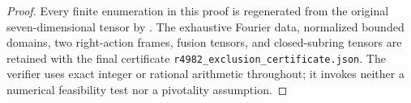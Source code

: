 \begin{proof}
Every finite enumeration in this proof is regenerated from the
original seven-dimensional tensor by
.
The exhaustive Fourier data, normalized bounded domains, two
right-action frames, fusion tensors, and closed-subring tensors
are retained with the final certificate
\texttt{r4982\_exclusion\_certificate.json}. The verifier uses exact
integer or rational arithmetic throughout; it invokes neither a
numerical feasibility test nor a pivotality assumption.
\end{proof}
